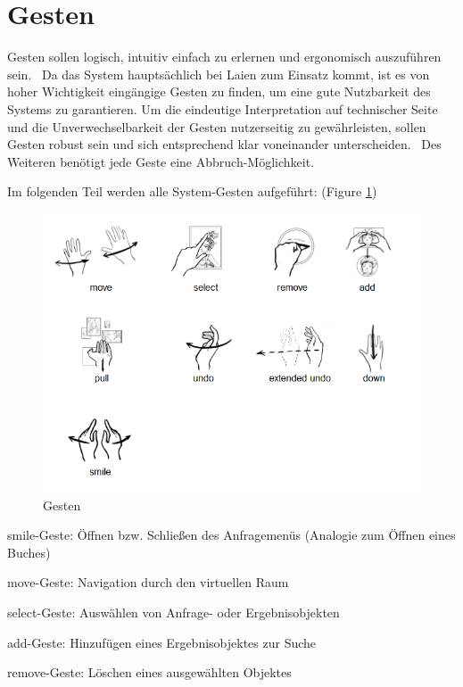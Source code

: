 \documentclass{sigchi-ext}
\begin{document}
\section{Gesten}
Gesten sollen logisch, intuitiv einfach zu erlernen und ergonomisch auszuführen sein.~\cite{3dinteraction:book} 
Da das System hauptsächlich bei Laien zum Einsatz kommt, ist es von hoher Wichtigkeit eingängige Gesten zu finden, um eine gute Nutzbarkeit des Systems zu garantieren.
Um die eindeutige Interpretation auf technischer Seite und die Unverwechselbarkeit der Gesten nutzerseitig zu gewährleisten, sollen Gesten robust sein und sich entsprechend klar voneinander unterscheiden.~\cite{3dinteraction:book,Dorau11}
Des Weiteren benötigt jede Geste eine Abbruch-Möglichkeit.~\cite{Dorau11} 

Im folgenden Teil werden alle System-Gesten aufgeführt: (Figure \ref{fig:gestures})

\begin{figure}
  \centering
  \includegraphics[width=1.8\marginparwidth]{figures/gestures.png}
  \caption{Gesten}
  \label{fig:gestures}
\end{figure}

smile-Geste: Öffnen bzw. Schließen des Anfragemenüs (Analogie zum Öffnen eines Buches)

move-Geste: Navigation durch den virtuellen Raum

select-Geste: Auswählen von Anfrage- oder Ergebnisobjekten

add-Geste: Hinzufügen eines Ergebnisobjektes zur Suche

remove-Geste: Löschen eines ausgewählten Objektes
\end{document}
